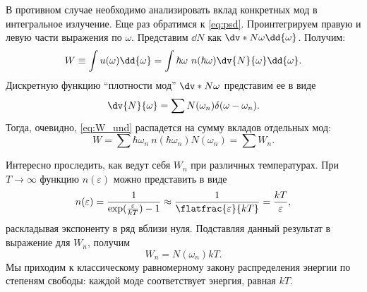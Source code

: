     В противном случае необходимо анализировать вклад конкретных мод в интегральное излучение. Еще раз обратимся к \autoref{eq:psd}. Проинтегрируем правую и левую части выражения по $\omega$. Представим $\dd{N}$ как $\dv*{N}{\omega}\dd{\omega}$. Получим:
    \begin{equation}\label{eq:W_und}
        W \equiv \int u(\omega) \dd{\omega} =
            \int \hbar\omega\ n(\hbar\omega) \dv{N}{\omega}\dd{\omega} .
    \end{equation}
    Дискретную функцию \enquote{плотности мод} $\dv*{N}{\omega}$ представим ее в виде
    \begin{equation}
        \dv{N}{\omega} = \sum N(\omega_n) \delta(\omega - \omega_n) .
    \end{equation}
    Тогда, очевидно, \autoref{eq:W_und} распадется на сумму вкладов отдельных мод:
    \begin{equation}\label{eq:W}
        W = \sum \hbar\omega_n\ n(\hbar\omega_n) N(\omega_n)
          = \sum W_n .
    \end{equation}

    Интересно проследить, как ведут себя $W_n$ при различных температурах. При $T \to \infty$ функцию $n(\varepsilon)$ можно представить в виде
    \begin{equation}
        n(\varepsilon)
            = \frac{1}{\exp(\frac{\varepsilon}{kT}) - 1}
            \approx \frac{1}{\flatfrac{\varepsilon}{kT}} = \frac{kT}{\varepsilon} ,
    \end{equation}
    раскладывая экспоненту в ряд вблизи нуля. Подставляя данный результат в выражение для $W_n$, получим
    \begin{equation}
        W_n = N(\omega_n) kT .
    \end{equation}
    Мы приходим к классическому равномерному закону распределения энергии по степеням свободы: каждой моде\footnotemark{} соответствует энергия, равная $kT$.


